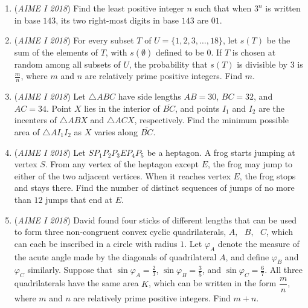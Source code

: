 \begin{enumerate}
	\item (\textit{AIME I 2018}) Find the least positive integer $n$ such that when $3^n$ is written in base $143$, its two right-most digits in base $143$ are $01$.


 

	\item (\textit{AIME I 2018}) For every subset $T$ of $U = \{ 1,2,3,\ldots,18 \}$, let $s(T)$ be the sum of the elements of $T$, with $s(\emptyset)$ defined to be $0$. If $T$ is chosen at random among all subsets of $U$, the probability that $s(T)$ is divisible by $3$ is $\frac{m}{n}$, where $m$ and $n$ are relatively prime positive integers. Find $m$.


 

	\item (\textit{AIME I 2018}) Let $\triangle ABC$ have side lengths $AB=30$, $BC=32$, and $AC=34$. Point $X$ lies in the interior of $\overline{BC}$, and points $I_1$ and $I_2$ are the incenters of $\triangle ABX$ and $\triangle ACX$, respectively. Find the minimum possible area of $\triangle AI_1I_2$ as $X$ varies along $\overline{BC}$.


 

	\item (\textit{AIME I 2018}) Let $SP_1P_2P_3EP_4P_5$ be a heptagon. A frog starts jumping at vertex $S$. From any vertex of the heptagon except $E$, the frog may jump to either of the two adjacent vertices. When it reaches vertex $E$, the frog stops and stays there. Find the number of distinct sequences of jumps of no more than $12$ jumps that end at $E$.


 

	\item (\textit{AIME I 2018}) David found four sticks of different lengths that can be used to form three non-congruent convex cyclic quadrilaterals, $A,\text{ }B,\text{ }C$, which can each be inscribed in a circle with radius $1$. Let $\varphi_A$ denote the measure of the acute angle made by the diagonals of quadrilateral $A$, and define $\varphi_B$ and $\varphi_C$ similarly. Suppose that $\sin\varphi_A=\frac{2}{3}$, $\sin\varphi_B=\frac{3}{5}$, and $\sin\varphi_C=\frac{6}{7}$. All three quadrilaterals have the same area $K$, which can be written in the form $\dfrac{m}{n}$, where $m$ and $n$ are relatively prime positive integers. Find $m+n$.


 

\end{enumerate}
